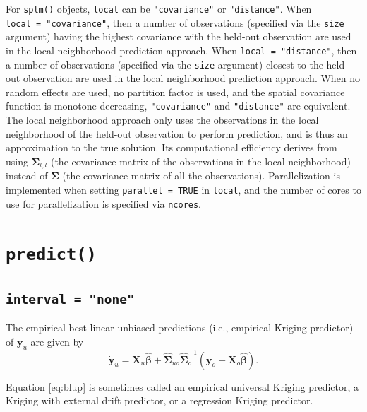 \documentclass[10pt,letterpaper]{article}
\begin{document}
For \texttt{splm()} objects, \texttt{local} can be \texttt{"covariance"}
or \texttt{"distance"}. When \texttt{local\ =\ "covariance"}, then a
number of observations (specified via the \texttt{size} argument) having
the highest covariance with the held-out observation are used in the
local neighborhood prediction approach. When
\texttt{local\ =\ "distance"}, then a number of observations (specified
via the \texttt{size} argument) closest to the held-out observation are
used in the local neighborhood prediction approach. When no random
effects are used, no partition factor is used, and the spatial
covariance function is monotone decreasing, \texttt{"covariance"} and
\texttt{"distance"} are equivalent. The local neighborhood approach only
uses the observations in the local neighborhood of the held-out
observation to perform prediction, and is thus an approximation to the
true solution. Its computational efficiency derives from using
\(\boldsymbol{\Sigma}_{l, l}\) (the covariance matrix of the
observations in the local neighborhood) instead of
\(\boldsymbol{\Sigma}\) (the covariance matrix of all the observations).
Parallelization is implemented when setting \texttt{parallel\ =\ TRUE}
in \texttt{local}, and the number of cores to use for parallelization is
specified via \texttt{ncores}.

\hypertarget{sec:predict}{%
\section{\texorpdfstring{\texttt{predict()}}{predict()}}\label{sec:predict}}

\hypertarget{interval-none}{%
\subsection{\texorpdfstring{\texttt{interval\ =\ "none"}}{interval = "none"}}\label{interval-none}}

The empirical best linear unbiased predictions (i.e., empirical Kriging
predictor) of \(\mathbf{y}_u\) are given by
\begin{equation}\label{eq:blup}
  \mathbf{\dot{y}}_u =  \mathbf{X}_u \hat{\boldsymbol{\beta}} + \hat{\boldsymbol{\Sigma}}_{uo} \hat{\boldsymbol{\Sigma}}^{-1}_{o} (\mathbf{y}_o - \mathbf{X}_o \hat{\boldsymbol{\beta}}) .
\end{equation}

Equation \ref{eq:blup} is sometimes called an empirical universal
Kriging predictor, a Kriging with external drift predictor, or a
regression Kriging predictor.
\end{document}
